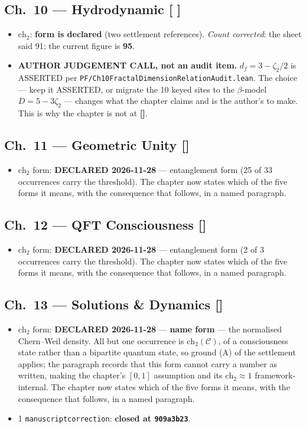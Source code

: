 \subsection*{Ch.~10 --- Hydrodynamic \hfill [\,\,]}
\begin{itemize}
\item $\mathrm{ch}_2$: \textbf{form is declared} (two settlement references).
\emph{Count corrected}: the sheet said 91; the current figure is \textbf{95}.
\item \textbf{AUTHOR JUDGEMENT CALL, not an audit item.} $d_f = 3 - \zeta_2/2$
is ASSERTED per \texttt{PF/Ch10FractalDimensionRelationAudit.lean}. The choice
--- keep it ASSERTED, or migrate the 10 keyed sites to the $\beta$-model
$D = 5 - 3\zeta_2$ --- changes what the chapter claims and is the author's to
make. This is why the chapter is not at \textbf{[\checkmark]}.
\end{itemize}

\subsection*{Ch.~11 --- Geometric Unity \hfill [\checkmark]}
\begin{itemize}
\item $\mathrm{ch}_2$ form: \textbf{DECLARED 2026-11-28} --- entanglement form (25 of 33 occurrences carry the threshold). The chapter now states which of the five forms it means, with the consequence that follows, in a named paragraph.
\end{itemize}

\subsection*{Ch.~12 --- QFT Consciousness \hfill [\checkmark]}
\begin{itemize}
\item $\mathrm{ch}_2$ form: \textbf{DECLARED 2026-11-28} --- entanglement form (2 of 3 occurrences carry the threshold). The chapter now states which of the five forms it means, with the consequence that follows, in a named paragraph.
\end{itemize}

\subsection*{Ch.~13 --- Solutions \& Dynamics \hfill [\checkmark]}
\begin{itemize}
\item $\mathrm{ch}_2$ form: \textbf{DECLARED 2026-11-28} --- \textbf{name form} --- the normalised Chern--Weil density. All but one occurrence is $\mathrm{ch}_2(\mathcal{C})$, of a consciousness state rather than a bipartite quantum state, so ground (A) of the settlement applies; the paragraph records that this form cannot carry a number as written, making the chapter's $[0,1]$ assumption and its $\mathrm{ch}_2 \approx 1$ framework-internal. The chapter now states which of the five forms it means, with the consequence that follows, in a named paragraph.
\item 1 \texttt{manuscriptcorrection}: \textbf{closed at \texttt{909a3b23}}.
\end{itemize}

